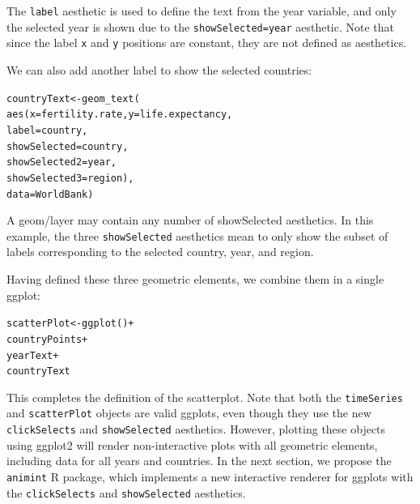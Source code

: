 \documentclass[journal]{vgtc}\usepackage[]{graphicx}\usepackage[]{color}
\makeatletter
\newcommand{\hlopt}[1]{\textcolor[rgb]{0,0,0}{#1}}%
\newcommand{\hlstd}[1]{\textcolor[rgb]{0,0,0}{#1}}%
\newcommand{\hlkwb}[1]{\textcolor[rgb]{0,0,0}{#1}}%
\newcommand{\hlkwc}[1]{\textcolor[rgb]{0,0,1}{#1}}%
\newcommand{\hlkwd}[1]{\textcolor[rgb]{0,0,0}{#1}}%
\newenvironment{kframe}{%
 \def\at@end@of@kframe{}%
 \ifinner\ifhmode%
  \def\at@end@of@kframe{\end{minipage}}%
  \begin{minipage}{\columnwidth}%
 \fi\fi%
 \def\FrameCommand##1{\hskip\@totalleftmargin \hskip-\fboxsep
 \colorbox{shadecolor}{##1}\hskip-\fboxsep
     \hskip-\linewidth \hskip-\@totalleftmargin \hskip\columnwidth}%
 \MakeFramed {\advance\hsize-\width
   \@totalleftmargin\z@ \linewidth\hsize
   \@setminipage}}%
 {\par\unskip\endMakeFramed%
 \at@end@of@kframe}
\newenvironment{knitrout}{}{} %
\makeatother
\begin{document}
The \texttt{label} aesthetic is used to define the text from the year
variable, and only the selected year is shown due to the
\texttt{showSelected=year} aesthetic. Note that since the label
\texttt{x} and \texttt{y} positions are constant, they are not defined
as aesthetics.

We can also add another label to show the selected countries:

\begin{knitrout}
\color{fgcolor}\begin{kframe}
\begin{alltt}
\hlstd{countryText} \hlkwb{<-} \hlkwd{geom_text}\hlstd{(}
    \hlkwd{aes}\hlstd{(}\hlkwc{x}\hlstd{=fertility.rate,} \hlkwc{y}\hlstd{=life.expectancy,}
        \hlkwc{label}\hlstd{=country,}
        \hlkwc{showSelected}\hlstd{=country,}
        \hlkwc{showSelected2}\hlstd{=year,}
        \hlkwc{showSelected3}\hlstd{=region),}
    \hlkwc{data}\hlstd{=WorldBank)}
\end{alltt}
\end{kframe}
\end{knitrout}

A geom/layer may contain any number of \mbox{showSelected}
aesthetics. In this example, the three \texttt{showSelected}
aesthetics mean to only show the subset of labels corresponding to the
selected country, year, and region.

Having defined these three geometric elements, we combine them in a
single ggplot:

\begin{knitrout}
\color{fgcolor}\begin{kframe}
\begin{alltt}
\hlstd{scatterPlot} \hlkwb{<-} \hlkwd{ggplot}\hlstd{()}\hlopt{+}
  \hlstd{countryPoints}\hlopt{+}
  \hlstd{yearText}\hlopt{+}
  \hlstd{countryText}
\end{alltt}
\end{kframe}
\end{knitrout}

This completes the definition of the scatterplot. Note that both the
\texttt{timeSeries} and \texttt{scatterPlot} objects are valid
ggplots, even though they use the new \texttt{clickSelects} and
\texttt{showSelected} aesthetics. However, plotting these objects
using ggplot2 will render non-interactive plots with all geometric
elements, including data for all years and countries. In the next
section, we propose the \texttt{animint} R package, which implements a new
interactive renderer for ggplots with the \texttt{clickSelects} and
\texttt{showSelected} aesthetics.
\end{document}
